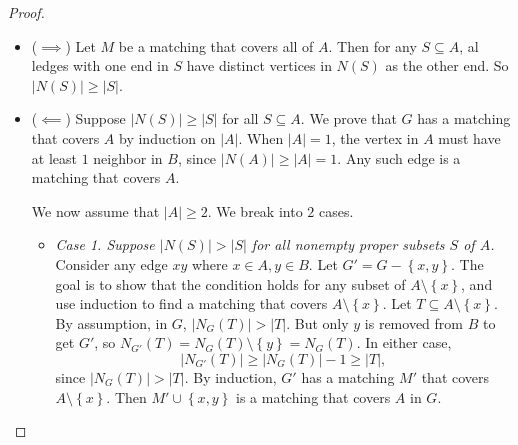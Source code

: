 \documentclass[co342]{subfiles}
\begin{document}
    \begin{proof}
        \begin{itemize}
            \item ($\implies$) Let $M$ be a matching that covers all of $A$. Then for any $S\subseteq A$, al ledges with one end in $S$ have distinct vertices in $N\left( S \right)$ as the other end. So $\left| N\left( S \right) \right|\geq\left| S \right|$.

            \item ($\impliedby$) Suppose $\left| N\left( S \right) \right|\geq \left| S \right|$ for all $S\subseteq A$. We prove that $G$ has a matching that covers $A$ by induction on $\left| A \right|$. When $\left| A \right|=1$, the vertex in $A$ must have at least $1$ neighbor in $B$, since $\left| N\left( A \right) \right|\geq \left| A \right|=1$. Any such edge is a matching that covers $A$.

                We now assume that $\left| A \right|\geq 2$. We break into $2$ cases.
                \begin{itemize}
                    \item \textit{Case 1. Suppose $\left| N\left( S \right) \right|>\left| S \right|$ for all nonempty proper subsets $S$ of $A$.} Consider any edge $xy$ where $x\in A, y\in B$. Let $G' = G-\left\lbrace x,y \right\rbrace$. The goal is to show that the condition holds for any subset of $A\setminus \left\lbrace x \right\rbrace$, and use induction to find a matching that covers $A\setminus \left\lbrace x \right\rbrace$. Let $T\subseteq A\setminus \left\lbrace x \right\rbrace$. By assumption, in $G$, $\left| N_G\left( T \right) \right|>\left| T \right|$. But only $y$ is removed from $B$ to get $G'$, so $N_{G'}\left( T \right)=N_G\left( T \right)\setminus \left\lbrace y \right\rbrace = N_G\left( T \right)$. In either case,
                        \begin{equation*}
                            \left| N_{G'}\left( T \right) \right|\geq \left| N_G\left( T \right) \right|-1\geq \left| T \right|,
                        \end{equation*}
                        since $\left| N_G\left( T \right) \right|>\left| T \right|$. By induction, $G'$ has a matching $M'$ that covers $A\setminus \left\lbrace x \right\rbrace$. Then $M'\cup \left\lbrace x,y \right\rbrace$ is a matching that covers $A$ in $G$.


\end{itemize}
\end{itemize}
\end{proof}
\end{document}
